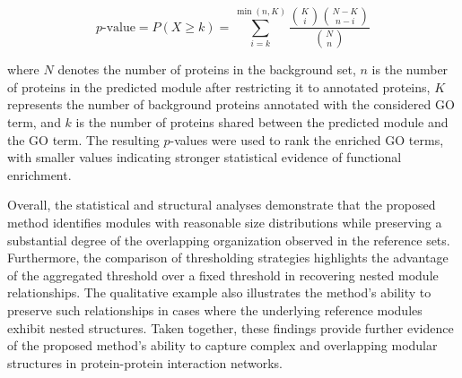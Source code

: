 \begin{equation}
p\text{-value} = P(X \geq k)
= \sum_{i=k}^{\min(n,K)}
\frac{\binom{K}{i}\binom{N-K}{n-i}}
{\binom{N}{n}}
\label{eq:p-value}
\end{equation}

where $N$ denotes the number of proteins in the background set, $n$ is the number of proteins in the predicted module after restricting it to annotated proteins, $K$ represents the number of background proteins annotated with the considered GO term, and $k$ is the number of proteins shared between the predicted module and the GO term. The resulting $p$-values were used to rank the enriched GO terms, with smaller values indicating stronger statistical evidence of functional enrichment.

Overall, the statistical and structural analyses demonstrate that the proposed method identifies modules with reasonable size distributions while preserving a substantial degree of the overlapping organization observed in the reference sets. Furthermore, the comparison of thresholding strategies highlights the advantage of the aggregated threshold over a fixed threshold in recovering nested module relationships. The qualitative example also illustrates the method's ability to preserve such relationships in cases where the underlying reference modules exhibit nested structures. Taken together, these findings provide further evidence of the proposed method's ability to capture complex and overlapping modular structures in protein-protein interaction networks.


